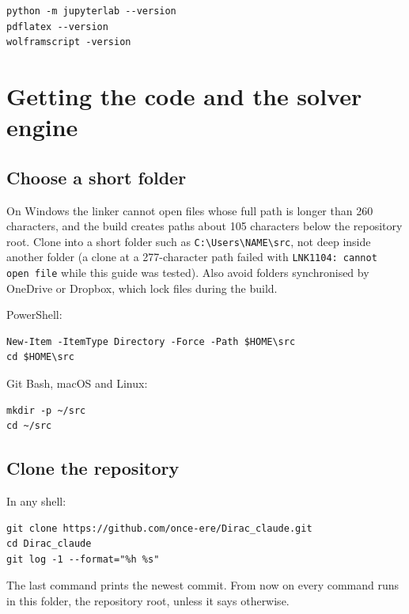 \documentclass[11pt]{article}
\begin{document}
\begin{Verbatim}[fontsize=\small]
python -m jupyterlab --version
pdflatex --version
wolframscript -version
\end{Verbatim}

\section{Getting the code and the solver engine}

\subsection{Choose a short folder}

On Windows the linker cannot open files whose full path is longer than 260 characters, and the build creates paths about 105 characters below the repository root. Clone into a short folder such as \texttt{C:\textbackslash{}Users\allowbreak{}\textbackslash{}NAME\textbackslash{}sr\allowbreak{}c}, not deep inside another folder (a clone at a 277-character path failed with \texttt{LNK1104:\allowbreak{} cannot \allowbreak{}open fil\allowbreak{}e} while this guide was tested). Also avoid folders synchronised by OneDrive or Dropbox, which lock files during the build.

PowerShell:

\begin{Verbatim}[fontsize=\small]
New-Item -ItemType Directory -Force -Path $HOME\src
cd $HOME\src
\end{Verbatim}

Git Bash, macOS and Linux:

\begin{Verbatim}[fontsize=\small]
mkdir -p ~/src
cd ~/src
\end{Verbatim}

\subsection{Clone the repository}

In any shell:

\begin{Verbatim}[fontsize=\small]
git clone https://github.com/once-ere/Dirac_claude.git
cd Dirac_claude
git log -1 --format="%h %s"
\end{Verbatim}

The last command prints the newest commit. From now on every command runs in this folder, the repository root, unless it says otherwise.
\end{document}
